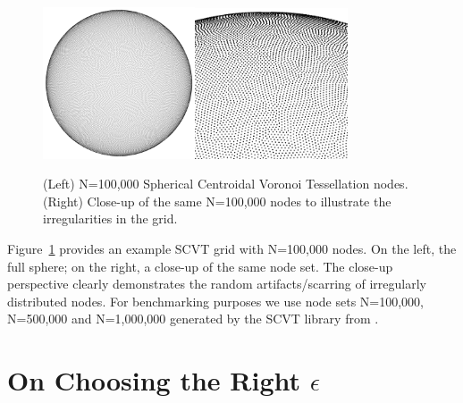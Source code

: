 \documentclass[11pt]{report}
\begin{document}
{\begin{figure} 
\centering
\includegraphics[width=0.4\textwidth]{rbffd_methods_content/grids/N100000_points.png}\includegraphics[width=0.405\textwidth]{rbffd_methods_content/grids/N100000_closeup2.png} 
\caption{(Left) N=100,000 Spherical Centroidal Voronoi Tessellation nodes. (Right) Close-up of the same N=100,000 nodes to illustrate the irregularities in the grid.} 
\label{fig:scvt_nodes}
\end{figure}

Figure~\ref{fig:scvt_nodes} provides an example SCVT grid with N=100,000 nodes. On the left, the full sphere; on the right, a close-up of the same node set. The close-up perspective clearly demonstrates the random artifacts/scarring of irregularly distributed nodes. For benchmarking purposes we use node sets N=100,000, N=500,000 and N=1,000,000 generated by the SCVT library from \cite{Womeldorff2008}. 

%
%
%

\section{On Choosing the Right $\epsilon$} 


}
\end{document}
